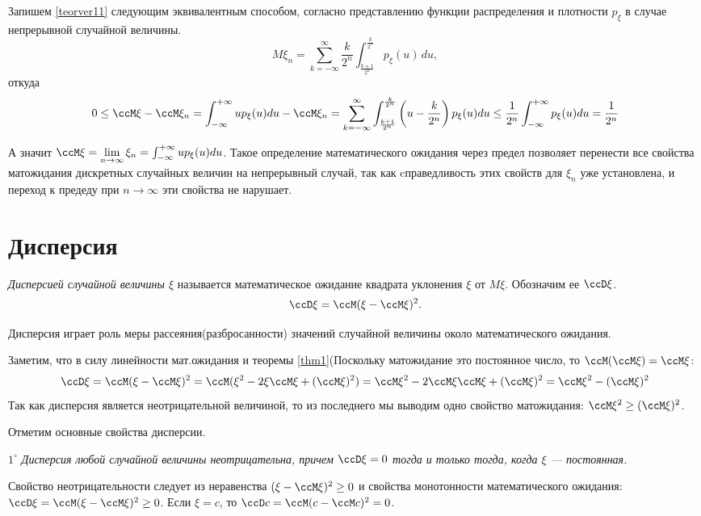 Запишем \eqref{teorver11} следующим эквивалентным способом, согласно представлению функции распределения и плотности $p_\xi$ в случае непрерывной случайной величины.
$$
M\xi_n = \sum\limits^{\infty}_{k=-\infty} \frac{k}{2^n}\int_{\frac{k+1}{2^n}}^{\frac{k}{2^n}}p_\xi(u)\,du,
$$
откуда 
$$
0\le \ccM\xi-\ccM\xi_n=\int_{-\infty}^{+\infty}up_\xi(u)du - \ccM\xi_n = \sum\limits^{\infty}_{k=-\infty}\int_{\frac{k+1}{2^n}}^{\frac{k}{2^n}}\left(u-\frac{k}{2^n}\right)p_\xi(u)du\le \frac{1}{2^n}\int_{-\infty}^{+\infty}p_\xi(u)du=\frac{1}{2^n}
$$

А значит $\ccM\xi=\lim\limits_{n\to\infty}\xi_n=\int_{-\infty}^{+\infty}up_\xi(u)du$. Такое определение математического ожидания через предел позволяет перенести все свойства матожидания дискретных случайных величин на непрерывный случай, так как cправедливость этих свойств для $\xi_n$ уже установлена, и переход к предеду при $n\to\infty$ эти свойства не нарушает.


\section{Дисперсия}
\begin{defn}
\textit{Дисперсией случайной величины $\xi$} называется математическое ожидание квадрата уклонения $\xi$ от $M\xi$. Обозначим ее $\ccD\xi$. 
\begin{equation} \label{ch31.4eq1}
\ccD\xi=\ccM(\xi-\ccM\xi)^2.
\end{equation}
\end{defn}

Дисперсия играет роль меры рассеяния(разбросанности) значений случайной величины около математического ожидания.

Заметим, что в силу линейности мат.ожидания и теоремы \ref{thm1}\;(Поскольку матожидание это постоянное число, то $\ccM(\ccM\xi)=\ccM\xi$:
\begin{multline*}
\ccD\xi = \ccM(\xi-\ccM\xi)^2=\ccM(\xi^2-2\xi \ccM\xi+(\ccM\xi)^2)=\ccM\xi^2-2\ccM\xi \ccM\xi+(\ccM\xi)^2=\ccM\xi^2-(\ccM\xi)^2
\end{multline*}
Так как дисперсия является неотрицательной величиной, то из последнего мы выводим одно свойство матожидания: $\ccM\xi^2\ge(\ccM\xi)^2$.

Отметим основные свойства дисперсии.

$1^{\circ}$ \textit{Дисперсия любой случайной величины неотрицательна, причем $\ccD\xi = 0$ тогда и только тогда, когда $\xi$ --- постоянная. }

Свойство неотрицательности следует из неравенства $(\xi - \ccM \xi)^2 \ge 0$ и свойства монотонности математического ожидания: $\ccD \xi = \ccM (\xi - \ccM \xi)^2 \ge 0$. Если $\xi = c$, то $\ccD c = \ccM (c - \ccM c)^2 = 0$. 

